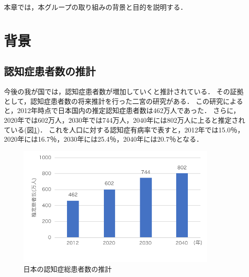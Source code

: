 \documentclass[../report]{subfiles}
\begin{document}
本章では，本グループの取り組みの背景と目的を説明する．

\section{背景}
\subsection{認知症患者数の推計}
今後の我が国では，認知症患者数が増加していくと推計されている．
その証拠として，認知症患者数の将来推計を行った二宮の研究\cite{syourai}がある．
この研究によると，2012年時点で日本国内の推定認知症患者数は462万人であった．
さらに，2020年では602万人，2030年では744万人，2040年には802万人に上ると推定されている(図\ref{fig:dementia-paitents-trasition})．
これを人口に対する認知症有病率で表すと，2012年では15.0％，2020年には16.7％，2030年には25.4％，2040年には20.7％となる．
\begin{figure}[htbp]
    \begin{center}
        \includegraphics[width=10cm]{imgs/1_dementia-paitents-trasition.pdf}
        \caption{日本の認知症総患者数の推計}
        \label{fig:dementia-paitents-trasition}
    \end{center}
\end{figure}
\end{document}
